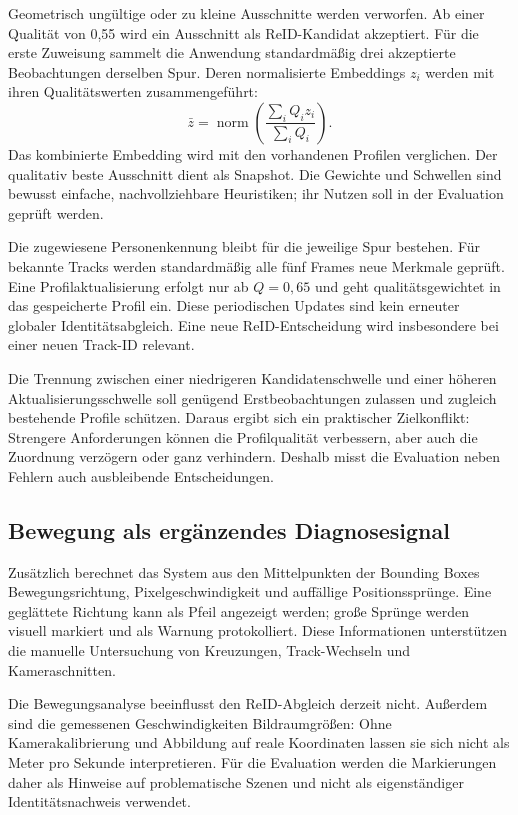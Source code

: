 \documentclass[runningheads]{llncs}
\begin{document}
Geometrisch ungültige oder zu kleine Ausschnitte werden verworfen. Ab einer Qualität von 0,55 wird ein Ausschnitt als ReID-Kandidat akzeptiert. Für die erste Zuweisung sammelt die Anwendung standardmä{\ss}ig drei akzeptierte Beobachtungen derselben Spur. Deren normalisierte Embeddings $z_i$ werden mit ihren Qualitätswerten zusammengeführt:
\begin{equation}
\bar z=\operatorname{norm}\left(
\frac{\sum_i Q_i z_i}{\sum_i Q_i}\right).
\label{eq:fusion}
\end{equation}
Das kombinierte Embedding wird mit den vorhandenen Profilen verglichen. Der qualitativ beste Ausschnitt dient als Snapshot. Die Gewichte und Schwellen sind bewusst einfache, nachvollziehbare Heuristiken; ihr Nutzen soll in der Evaluation geprüft werden.

Die zugewiesene Personenkennung bleibt für die jeweilige Spur bestehen. Für bekannte Tracks werden standardmä{\ss}ig alle fünf Frames neue Merkmale geprüft. Eine Profilaktualisierung erfolgt nur ab $Q=0{,}65$ und geht qualitätsgewichtet in das gespeicherte Profil ein. Diese periodischen Updates sind kein erneuter globaler Identitätsabgleich. Eine neue ReID-Entscheidung wird insbesondere bei einer neuen Track-ID relevant.

Die Trennung zwischen einer niedrigeren Kandidatenschwelle und einer höheren Aktualisierungsschwelle soll genügend Erstbeobachtungen zulassen und zugleich bestehende Profile schützen. Daraus ergibt sich ein praktischer Zielkonflikt: Strengere Anforderungen können die Profilqualität verbessern, aber auch die Zuordnung verzögern oder ganz verhindern. Deshalb misst die Evaluation neben Fehlern auch ausbleibende Entscheidungen.

\subsection{Bewegung als ergänzendes Diagnosesignal}

Zusätzlich berechnet das System aus den Mittelpunkten der Bounding Boxes Bewegungsrichtung, Pixelgeschwindigkeit und auffällige Positionssprünge. Eine geglättete Richtung kann als Pfeil angezeigt werden; gro{\ss}e Sprünge werden visuell markiert und als Warnung protokolliert. Diese Informationen unterstützen die manuelle Untersuchung von Kreuzungen, Track-Wechseln und Kameraschnitten.

Die Bewegungsanalyse beeinflusst den ReID-Abgleich derzeit nicht. Au{\ss}erdem sind die gemessenen Geschwindigkeiten Bildraumgrö{\ss}en: Ohne Kamerakalibrierung und Abbildung auf reale Koordinaten lassen sie sich nicht als Meter pro Sekunde interpretieren. Für die Evaluation werden die Markierungen daher als Hinweise auf problematische Szenen und nicht als eigenständiger Identitätsnachweis verwendet.
\end{document}
